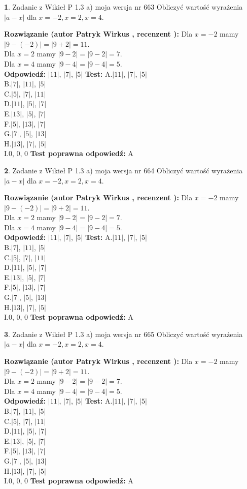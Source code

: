 \documentclass[12pt, a4paper]{article}
\theoremstyle{definition} %
\newtheorem{zad}{}
\newcommand{\zadStart}[1]{\begin{zad}#1\newline}
\newcommand{\zadStop}{\end{zad}}
\newcommand{\rozwStart}[2]{\noindent \textbf{Rozwiązanie (autor #1 , recenzent #2): }\newline}
\newcommand{\rozwStop}{\newline}
\newcommand{\odpStart}{\noindent \textbf{Odpowiedź:}\newline}
\newcommand{\odpStop}{\newline}
\newcommand{\testStart}{\noindent \textbf{Test:}\newline}
\newcommand{\testStop}{\newline}
\newcommand{\kluczStart}{\noindent \textbf{Test poprawna odpowiedź:}\newline}
\newcommand{\kluczStop}{\newline}
\begin{document}
\zadStart{Zadanie z Wikieł P 1.3 a) moja wersja nr 663}
Obliczyć wartość wyrażenia $|a - x|$ dla $x=-2,x=2,x=4$.
\zadStop
\rozwStart{Patryk Wirkus}{}
Dla $x = -2$ mamy $|9 - (-2)| = |9 + 2| = 11$.\\
Dla $x = 2$ mamy $|9 - 2| = |9 - 2| = 7$.\\
Dla $x = 4$ mamy $|9 - 4| = |9 - 4| = 5$.\\
\rozwStop
\odpStart
$|11|$, $|7|$, $|5|$
\odpStop
\testStart
A.$|11|$, $|7|$, $|5|$\\
B.$|7|$, $|11|$, $|5|$\\
C.$|5|$, $|7|$, $|11|$\\
D.$|11|$, $|5|$, $|7|$\\
E.$|13|$, $|5|$, $|7|$\\
F.$|5|$, $|13|$, $|7|$\\
G.$|7|$, $|5|$, $|13|$\\
H.$|13|$, $|7|$, $|5|$\\
I.$0$, $0$, $0$
\testStop
\kluczStart
A
\kluczStop



\zadStart{Zadanie z Wikieł P 1.3 a) moja wersja nr 664}
Obliczyć wartość wyrażenia $|a - x|$ dla $x=-2,x=2,x=4$.
\zadStop
\rozwStart{Patryk Wirkus}{}
Dla $x = -2$ mamy $|9 - (-2)| = |9 + 2| = 11$.\\
Dla $x = 2$ mamy $|9 - 2| = |9 - 2| = 7$.\\
Dla $x = 4$ mamy $|9 - 4| = |9 - 4| = 5$.\\
\rozwStop
\odpStart
$|11|$, $|7|$, $|5|$
\odpStop
\testStart
A.$|11|$, $|7|$, $|5|$\\
B.$|7|$, $|11|$, $|5|$\\
C.$|5|$, $|7|$, $|11|$\\
D.$|11|$, $|5|$, $|7|$\\
E.$|13|$, $|5|$, $|7|$\\
F.$|5|$, $|13|$, $|7|$\\
G.$|7|$, $|5|$, $|13|$\\
H.$|13|$, $|7|$, $|5|$\\
I.$0$, $0$, $0$
\testStop
\kluczStart
A
\kluczStop



\zadStart{Zadanie z Wikieł P 1.3 a) moja wersja nr 665}
Obliczyć wartość wyrażenia $|a - x|$ dla $x=-2,x=2,x=4$.
\zadStop
\rozwStart{Patryk Wirkus}{}
Dla $x = -2$ mamy $|9 - (-2)| = |9 + 2| = 11$.\\
Dla $x = 2$ mamy $|9 - 2| = |9 - 2| = 7$.\\
Dla $x = 4$ mamy $|9 - 4| = |9 - 4| = 5$.\\
\rozwStop
\odpStart
$|11|$, $|7|$, $|5|$
\odpStop
\testStart
A.$|11|$, $|7|$, $|5|$\\
B.$|7|$, $|11|$, $|5|$\\
C.$|5|$, $|7|$, $|11|$\\
D.$|11|$, $|5|$, $|7|$\\
E.$|13|$, $|5|$, $|7|$\\
F.$|5|$, $|13|$, $|7|$\\
G.$|7|$, $|5|$, $|13|$\\
H.$|13|$, $|7|$, $|5|$\\
I.$0$, $0$, $0$
\testStop
\kluczStart
A
\kluczStop
\end{document}
